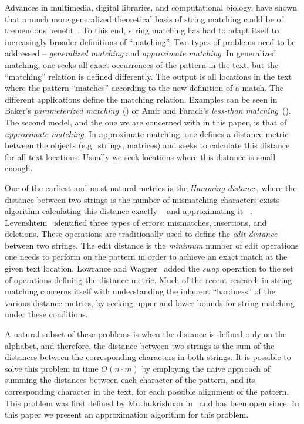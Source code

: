 \documentclass[11pt]{article}
\begin{document}
 Advances in multimedia, digital libraries, and computational
biology, have shown that a much more generalized theoretical basis
of string matching could be of tremendous
benefit~\cite{Pentland-92,olson:95}.
 To this end, string matching has had to adapt itself to
increasingly broader definitions of ``matching''. Two types of
problems need to be addressed -- {\it generalized matching} and
{\it approximate matching}. In generalized matching, one seeks all
exact occurrences of the pattern in the text, but the ``matching''
relation is defined differently. The output is all locations in
the text where the pattern ``matches'' according to the new
definition of a match. The different applications define the
matching relation. Examples can be seen in Baker's {\it
parameterized matching}~(\cite{bak:93}) or Amir and Farach's {\it
less-than matching}~(\cite{AF-95}). The second model, and the one
we are concerned with in this paper, is that of {\em approximate
matching}. In approximate matching, one defines a distance metric
between the objects (e.g.\ strings, matrices) and seeks to
calculate this distance for all text locations. Usually we seek
locations where this distance is small enough.

One of the earliest and most natural metrics is the {\it Hamming
distance}, where the distance between two strings is the number of
mismatching characters exists algorithm calculating this distance
exactly ~\cite{ALP0:00} and approximating it ~\cite{karloff:93}.
Levenshtein~\cite{L-66} identified three types of errors:
mismatches, insertions, and deletions. These operations are
traditionally used to define the {\it edit distance} between two
strings. The edit distance is the {\it minimum} number of edit
operations one needs to perform on the pattern in order to achieve
an exact match at the given text location. Lowrance and
Wagner~\cite{lw-75,wagner-75} added the {\it swap} operation to
the set of operations defining the distance metric.
 Much of the recent research in string matching
concerns itself with understanding the inherent ``hardness'' of
the various distance metrics, by seeking upper and lower bounds
for string matching under these conditions.

A natural subset of these problems is when the distance is defined
only on the alphabet, and therefore, the distance between two
strings is the sum of the distances between the corresponding characters
in both strings. It is possible to solve this problem in time
$O(n\cdot m)$ by employing the naive approach of summing the
distances between each character of the pattern, and its
corresponding character in the text, for each possible alignment
of the pattern. This problem was first defined by Muthukrishnan
in~\cite{muthu-open} and has been open since. In this paper we
present an approximation algorithm for this problem.
\end{document}
